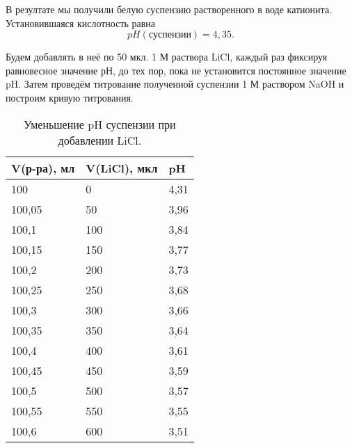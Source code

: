 \documentclass[a4paper,12pt]{article} %
\begin{document}
В резултате мы получили белую суспензию растворенного в воде катионита. Установившаяся кислотность равна 
 \begin{equation*}
     pH(\textit{суспензии}) = 4,35.
 \end{equation*}


Будем добавлять в неё по 50 мкл. 1 М раствора LiCl,
каждый раз фиксируя равновесное значение рН, до тех пор, пока не установится постоянное значение pH. Затем проведём титрование полученной суспензии 1 М раствором NaOH и построим кривую титрования.

\begin{table}[H]
    \centering
    \begin{tabular}{|l|l|l|}
    \hline
        V(р-ра), мл & V(LiCl), мкл & pH \\ \hline
        100 & 0 & 4,31 \\ \hline
        100,05 & 50 & 3,96 \\ \hline
        100,1 & 100 & 3,84 \\ \hline
        100,15 & 150 & 3,77 \\ \hline
        100,2 & 200 & 3,73 \\ \hline
        100,25 & 250 & 3,68 \\ \hline
        100,3 & 300 & 3,66 \\ \hline
        100,35 & 350 & 3,64 \\ \hline
        100,4 & 400 & 3,61 \\ \hline
        100,45 & 450 & 3,59 \\ \hline
        100,5 & 500 & 3,57 \\ \hline
        100,55 & 550 & 3,55 \\ \hline
        100,6 & 600 & 3,51 \\ \hline
    \end{tabular}
    \caption{Уменьшение pH суспензии при добавлении LiCl.}
\end{table}
\end{document}
